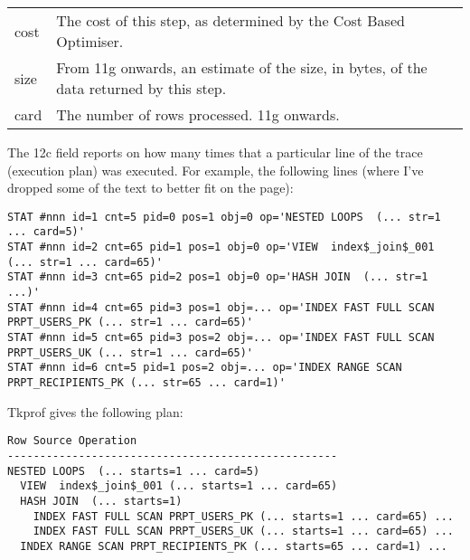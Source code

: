 \begin{longtable}[]{@{}l|l@{}}
\begin{minipage}[t]{0.14\columnwidth}
cost\strut
\end{minipage} & \begin{minipage}[t]{0.65\columnwidth}\raggedright\strut
The cost of this step, as determined by the Cost Based Optimiser.\strut
\end{minipage}\tabularnewline
\begin{minipage}[t]{0.14\columnwidth}\raggedright\strut
size\strut
\end{minipage} & \begin{minipage}[t]{0.65\columnwidth}\raggedright\strut
From 11g onwards, an estimate of the size, in bytes, of the data returned by
this step.\strut
\end{minipage}\tabularnewline
\begin{minipage}[t]{0.14\columnwidth}\raggedright\strut
card\strut
\end{minipage} & \begin{minipage}[t]{0.65\columnwidth}\raggedright\strut
The number of rows processed. 11g onwards.\strut
\end{minipage}\tabularnewline
\bottomrule
\end{longtable}

The 12c field  reports on how many times that a particular line of the trace (execution plan) was executed. For example, the following  lines (where I've dropped some of the text to better fit on the page):

\begin{lstlisting}[numbers=none,caption={Example 12c STAT lines}]
STAT #nnn id=1 cnt=5 pid=0 pos=1 obj=0 op='NESTED LOOPS  (... str=1 ... card=5)'
STAT #nnn id=2 cnt=65 pid=1 pos=1 obj=0 op='VIEW  index$_join$_001 (... str=1 ... card=65)'
STAT #nnn id=3 cnt=65 pid=2 pos=1 obj=0 op='HASH JOIN  (... str=1 ...)'
STAT #nnn id=4 cnt=65 pid=3 pos=1 obj=... op='INDEX FAST FULL SCAN PRPT_USERS_PK (... str=1 ... card=65)'
STAT #nnn id=5 cnt=65 pid=3 pos=2 obj=... op='INDEX FAST FULL SCAN PRPT_USERS_UK (... str=1 ... card=65)'
STAT #nnn id=6 cnt=5 pid=1 pos=2 obj=... op='INDEX RANGE SCAN PRPT_RECIPIENTS_PK (... str=65 ... card=1)'\end{lstlisting}

Tkprof gives the following plan:

\begin{lstlisting}[numbers=none,caption={Example 12c tkprof output}]
Row Source Operation
---------------------------------------------------
NESTED LOOPS  (... starts=1 ... card=5)
  VIEW  index$_join$_001 (... starts=1 ... card=65)
  HASH JOIN  (... starts=1)
    INDEX FAST FULL SCAN PRPT_USERS_PK (... starts=1 ... card=65) ...
    INDEX FAST FULL SCAN PRPT_USERS_UK (... starts=1 ... card=65) ...
  INDEX RANGE SCAN PRPT_RECIPIENTS_PK (... starts=65 ... card=1) ...
\end{lstlisting}


